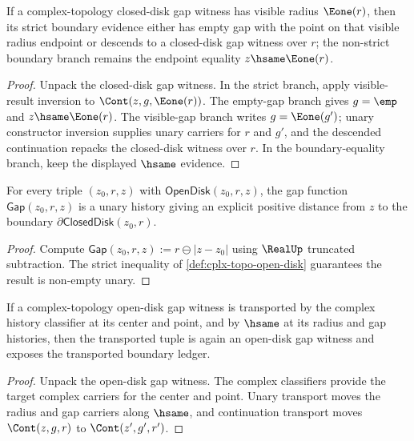 \begin{theorem}
\label{thm:cplx-topo-closed-disk-gap-visible-radius-boundary-cases}
If a complex-topology closed-disk gap witness has visible radius
\(\Eone(r)\), then its strict boundary evidence either has empty gap with the
point on that visible radius endpoint or descends to a closed-disk gap witness
over \(r\); the non-strict boundary branch remains the endpoint equality
\(z\hsame\Eone(r)\).
\end{theorem}
\begin{proof}
Unpack the closed-disk gap witness. In the strict branch, apply visible-result
inversion to \(\Cont(z,g,\Eone(r))\). The empty-gap branch gives
\(g=\emp\) and \(z\hsame\Eone(r)\). The visible-gap branch writes
\(g=\Eone(g')\); unary constructor inversion supplies unary carriers for
\(r\) and \(g'\), and the descended continuation repacks the closed-disk
witness over \(r\). In the boundary-equality branch, keep the displayed
\(\hsame\) evidence.
\end{proof}

\begin{theorem}
\label{thm:cplx-topo-gap-modulus}
For every triple \((z_0, r, z)\) with \(\mathsf{OpenDisk}(z_0, r, z)\), the gap function \(\mathsf{Gap}(z_0, r, z)\) is a unary history giving an explicit positive distance from \(z\) to the boundary \(\partial \mathsf{ClosedDisk}(z_0, r)\).
\end{theorem}
\begin{proof}
Compute \(\mathsf{Gap}(z_0, r, z) := r \ominus |z - z_0|\) using \(\RealUp\) truncated subtraction. The strict inequality of \autoref{def:cplx-topo-open-disk} guarantees the result is non-empty unary.
\end{proof}

\begin{lemma}
\label{lem:cplx-topo-open-disk-gap-hsame-transport}
If a complex-topology open-disk gap witness is transported by the complex
history classifier at its center and point, and by \(\hsame\) at its radius
and gap histories, then the transported tuple is again an open-disk gap
witness and exposes the transported boundary ledger.
\end{lemma}
\begin{proof}
Unpack the open-disk gap witness. The complex classifiers provide the target
complex carriers for the center and point. Unary transport moves the radius
and gap carriers along \(\hsame\), and continuation transport moves
\(\Cont(z,g,r)\) to \(\Cont(z',g',r')\).
\end{proof}

